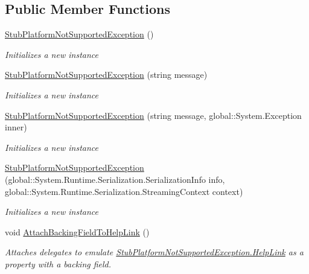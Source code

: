 \subsection*{Public Member Functions}
\begin{DoxyCompactItemize}
\item 
\hyperlink{class_system_1_1_fakes_1_1_stub_platform_not_supported_exception_a941757061da3b8c91db6122f1141ca85}{Stub\-Platform\-Not\-Supported\-Exception} ()
\begin{DoxyCompactList}\small\item\em Initializes a new instance\end{DoxyCompactList}\item 
\hyperlink{class_system_1_1_fakes_1_1_stub_platform_not_supported_exception_a776c96d60f0b287e09661ff52f016bc5}{Stub\-Platform\-Not\-Supported\-Exception} (string message)
\begin{DoxyCompactList}\small\item\em Initializes a new instance\end{DoxyCompactList}\item 
\hyperlink{class_system_1_1_fakes_1_1_stub_platform_not_supported_exception_aabd803160c3d2ebe6ad282a1a1e7d674}{Stub\-Platform\-Not\-Supported\-Exception} (string message, global\-::\-System.\-Exception inner)
\begin{DoxyCompactList}\small\item\em Initializes a new instance\end{DoxyCompactList}\item 
\hyperlink{class_system_1_1_fakes_1_1_stub_platform_not_supported_exception_abdbfee3c1c0d27771a60c1fdb8d7d2c9}{Stub\-Platform\-Not\-Supported\-Exception} (global\-::\-System.\-Runtime.\-Serialization.\-Serialization\-Info info, global\-::\-System.\-Runtime.\-Serialization.\-Streaming\-Context context)
\begin{DoxyCompactList}\small\item\em Initializes a new instance\end{DoxyCompactList}\item 
void \hyperlink{class_system_1_1_fakes_1_1_stub_platform_not_supported_exception_a1a7a1b5651a616be7ebea4a83ff2cbe1}{Attach\-Backing\-Field\-To\-Help\-Link} ()
\begin{DoxyCompactList}\small\item\em Attaches delegates to emulate \hyperlink{class_system_1_1_fakes_1_1_stub_platform_not_supported_exception_a56b284c220fe7f947dad8a469bccb0cd}{Stub\-Platform\-Not\-Supported\-Exception.\-Help\-Link} as a property with a backing field.\end{DoxyCompactList}\item 

\end{DoxyCompactItemize}
